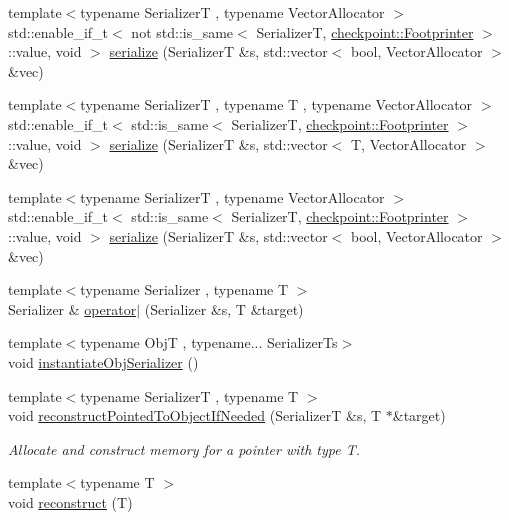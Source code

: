 \begin{DoxyCompactItemize}
\item 
{\footnotesize template$<$typename SerializerT , typename Vector\+Allocator $>$ }\\std\+::enable\+\_\+if\+\_\+t$<$ not std\+::is\+\_\+same$<$ SerializerT, \hyperlink{structcheckpoint_1_1_footprinter}{checkpoint\+::\+Footprinter} $>$\+::value, void $>$ \hyperlink{namespacecheckpoint_a4dbdef848c92782b54888f6247f8e8ba}{serialize} (SerializerT \&s, std\+::vector$<$ bool, Vector\+Allocator $>$ \&vec)
\item 
{\footnotesize template$<$typename SerializerT , typename T , typename Vector\+Allocator $>$ }\\std\+::enable\+\_\+if\+\_\+t$<$ std\+::is\+\_\+same$<$ SerializerT, \hyperlink{structcheckpoint_1_1_footprinter}{checkpoint\+::\+Footprinter} $>$\+::value, void $>$ \hyperlink{namespacecheckpoint_a3f43839a02cd77538b0d2f4192e926be}{serialize} (SerializerT \&s, std\+::vector$<$ T, Vector\+Allocator $>$ \&vec)
\item 
{\footnotesize template$<$typename SerializerT , typename Vector\+Allocator $>$ }\\std\+::enable\+\_\+if\+\_\+t$<$ std\+::is\+\_\+same$<$ SerializerT, \hyperlink{structcheckpoint_1_1_footprinter}{checkpoint\+::\+Footprinter} $>$\+::value, void $>$ \hyperlink{namespacecheckpoint_af95ab4d3ad37bb33b284e3a51047d685}{serialize} (SerializerT \&s, std\+::vector$<$ bool, Vector\+Allocator $>$ \&vec)
\item 
{\footnotesize template$<$typename Serializer , typename T $>$ }\\Serializer \& \hyperlink{namespacecheckpoint_a5c9a1c4d05ec6880270c9a6d0dded825}{operator$\vert$} (Serializer \&s, T \&target)
\item 
{\footnotesize template$<$typename ObjT , typename... Serializer\+Ts$>$ }\\void \hyperlink{namespacecheckpoint_a09875c2d3c012be868f3fd88b3ed55be}{instantiate\+Obj\+Serializer} ()
\item 
{\footnotesize template$<$typename SerializerT , typename T $>$ }\\void \hyperlink{namespacecheckpoint_a9ffb72abb4d8c3fe031626dbf526d70c}{reconstruct\+Pointed\+To\+Object\+If\+Needed} (SerializerT \&s, T $\ast$\&target)
\begin{DoxyCompactList}\small\item\em Allocate and construct memory for a pointer with type {\ttfamily T}. \end{DoxyCompactList}\item 
{\footnotesize template$<$typename T $>$ }\\void \hyperlink{namespacecheckpoint_a6254f2e220f905a2b0c797c08092a7a1}{reconstruct} (T)
\end{DoxyCompactItemize}


